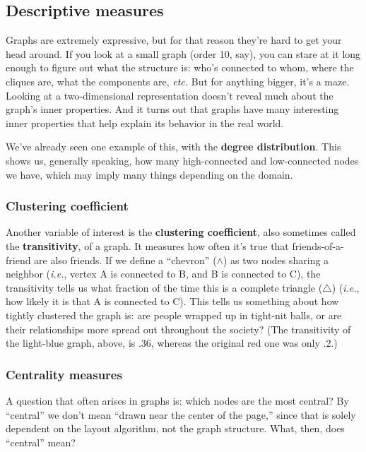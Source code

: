 \documentclass[12pt]{article}
\begin{document}
\subsection{Descriptive measures}

Graphs are extremely expressive, but for that reason they're hard to get your
head around. If you look at a small graph (order 10, say), you can stare at it
long enough to figure out what the structure is: who's connected to whom,
where the cliques are, what the components are, \textit{etc.} But for anything
bigger, it's a maze. Looking at a two-dimensional representation doesn't
reveal much about the graph's inner properties. And it turns out that graphs
have many interesting inner properties that help explain its behavior in the
real world.

We've already seen one example of this, with the \textbf{degree distribution}.
This shows us, generally speaking, how many high-connected and low-connected
nodes we have, which may imply many things depending on the domain.

\subsubsection{Clustering coefficient}

Another variable of interest is the \textbf{clustering coefficient}, also
sometimes called the \textbf{transitivity}, of a graph. It measures how often
it's true that friends-of-a-friend are also friends. If we define a
``chevron''
($\wedge$) as two nodes sharing a neighbor (\textit{i.e.}, vertex A is
connected to B, and B is connected to C), the transitivity tells us what
fraction of the time this is a complete triangle ($\triangle$) (\textit{i.e.},
how likely it is that A is connected to C). This tells us something about how
tightly clustered the graph is: are people wrapped up in tight-nit balls, or
are their relationships more spread out throughout the society? (The
transitivity of the light-blue graph, above, is .36, whereas the original red
one was only .2.)

\subsubsection{Centrality measures}

A question that often arises in graphs is: which nodes are the most central?
By ``central'' we don't mean ``drawn near the center of the page,'' since that
is solely dependent on the layout algorithm, not the graph structure. What,
then, does ``central'' mean?
\end{document}
